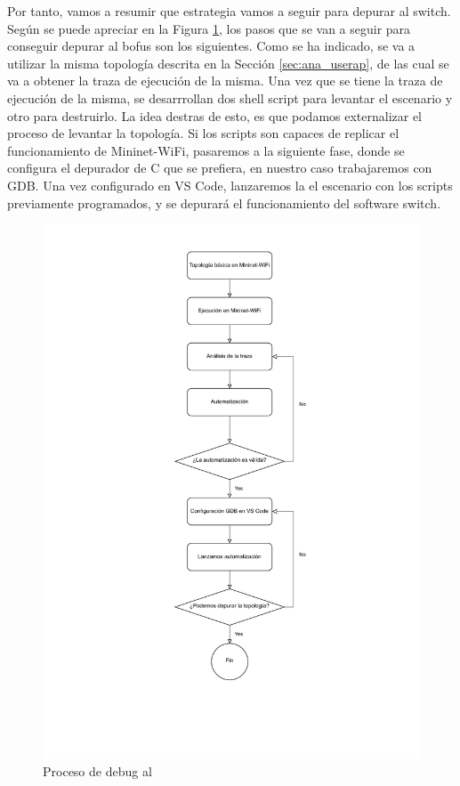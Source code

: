 Por tanto, vamos a resumir que estrategia vamos a seguir para depurar al switch. Según se puede apreciar en la Figura \ref{fig:debugBOFUSS}, los pasos que se van a seguir para conseguir depurar al \gls{bofus} son los siguientes. Como se ha indicado, se va a utilizar la misma topología descrita en la Sección \ref{sec:ana_userap}, de las cual se va a obtener la traza de ejecución de la misma. Una vez que se tiene la traza de ejecución de la misma, se desarrrollan dos shell script para levantar el escenario y otro para destruirlo. La idea destras de esto, es que podamos externalizar el proceso de levantar la topología. Si los scripts son capaces de replicar el funcionamiento de Mininet-WiFi, pasaremos a la siguiente fase, donde se configura el depurador de C que se prefiera, en nuestro caso trabajaremos con GDB. Una vez configurado en VS Code, lanzaremos la el escenario con los scripts previamente programados, y se depurará el funcionamiento del software switch.

\begin{figure}[ht!]
    \centering
    \includegraphics[width=\textwidth]{archivos/img/analisis/debugBOFUSS.drawio.pdf}
    \caption{Proceso de debug al }
    \label{fig:debugBOFUSS}
\end{figure}

